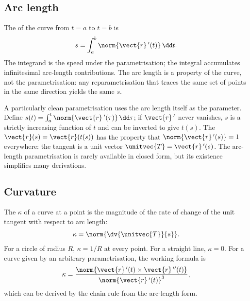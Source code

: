 \subsection{Arc length}

The  of the curve from $t = a$ to $t = b$ is
\[
s = \int_{a}^{b} \norm{\vect{r}\,'(t)} \,\dd t.
\]
The integrand is the speed under the parametrisation; the integral
accumulates infinitesimal arc-length contributions. The arc length
is a property of the curve, not the parametrisation: any
reparametrisation that traces the same set of points in the same
direction yields the same $s$.

A particularly clean parametrisation uses the arc length itself as
the parameter. Define $s(t) = \int_{a}^{t} \norm{\vect{r}\,'(\tau)}
\,\dd\tau$; if $\vect{r}\,'$ never vanishes, $s$ is a strictly
increasing function of $t$ and can be inverted to give $t(s)$. The
 $\vect{r}(s) = \vect{r}(t(s))$
has the property that $\norm{\vect{r}\,'(s)} = 1$ everywhere: the
tangent is a unit vector $\unitvec{T} = \vect{r}\,'(s)$. The
arc-length parametrisation is rarely available in closed form, but
its existence simplifies many derivations.

\subsection{Curvature}

The  $\kappa$ of a curve at a point is the
magnitude of the rate of change of the unit tangent with respect to
arc length:
\[
\kappa = \norm{\dv{\unitvec{T}}{s}}.
\]
For a circle of radius $R$, $\kappa = 1/R$ at every point. For a
straight line, $\kappa = 0$. For a curve given by an arbitrary
parametrisation, the working formula is
\[
\kappa = \frac{\norm{\vect{r}\,'(t) \times \vect{r}\,''(t)}}
              {\norm{\vect{r}\,'(t)}^{3}},
\]
which can be derived by the chain rule from the arc-length form.

